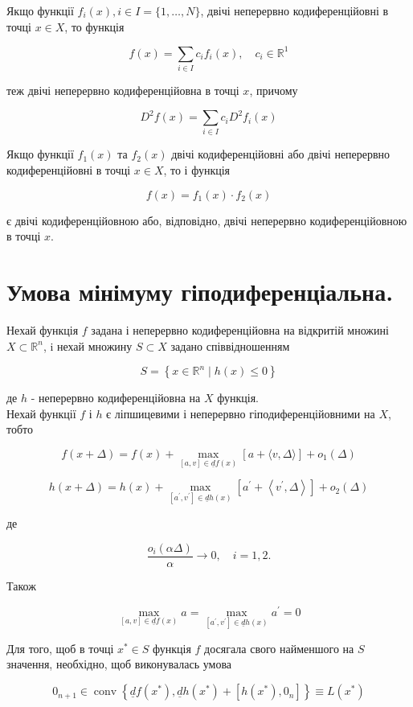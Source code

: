 \documentclass[10pt]{article}
\begin{document}
Якщо функції $f_{i}(x), i \in I=\{1, \ldots, N\}$, двічі неперервно кодиференційовні в точці $x \in X$, то функція

$$
f(x)=\sum_{i \in I} c_{i} f_{i}(x), \quad c_{i} \in \mathbb{R}^{1}
$$

теж двічі неперервно кодиференційовна в точці $x$, причому

$$
D^{2} f(x)=\sum_{i \in I} c_{i} D^{2} f_{i}(x)
$$

Якщо функції $f_{1}(x)$ та $f_{2}(x)$ двічі кодиференційовні або двічі неперервно кодиференційовні в точці $x \in X$, то і функція

$$
f(x)=f_{1}(x) \cdot f_{2}(x)
$$

є двічі кодиференційовною або, відповідно, двічі неперервно кодиференційовною в точці $x$.

\section*{Умова мінімуму гіподиференціальна.}
Нехай функція $f$ задана і неперервно кодиференційовна на відкритій множині $X \subset \mathbb{R}^{n}$, i нехай множину $S \subset X$ задано співвідношенням

$$
S=\left\{x \in \mathbb{R}^{n} \mid h(x) \leq 0\right\}
$$

де $h$ - неперервно кодиференційовна на $X$ функція.\\
Нехай функції $f$ і $h$ є ліпшицевими і неперервно гіподиференційовними на $X$, тобто

$$
f(x+\Delta)=f(x)+\max _{[a, v] \in \underline{d} f(x)}[a+\langle v, \Delta\rangle]+o_{1}(\Delta)
$$

$$
h(x+\Delta)=h(x)+\max _{\left[a^{\prime}, v^{\prime}\right] \in \underline{d} h(x)}\left[a^{\prime}+\left\langle v^{\prime}, \Delta\right\rangle\right]+o_{2}(\Delta)
$$

де

$$
\frac{o_{i}(\alpha \Delta)}{\alpha} \rightarrow 0, \quad i=1,2 .
$$

Також

$$
\max _{[a, v] \in \underline{d} f(x)} a=\max _{\left[a^{\prime}, v^{\prime}\right] \in \underline{d} h(x)} a^{\prime}=0
$$

Для того, щоб в точці $x^{*} \in S$ функція $f$ досягала свого найменшого на $S$ значення, необхідно, щоб виконувалась умова

$$
0_{n+1} \in \operatorname{conv}\left\{\underline{d} f\left(x^{*}\right), \underline{d} h\left(x^{*}\right)+\left[h\left(x^{*}\right), 0_{n}\right]\right\} \equiv L\left(x^{*}\right)
$$
\end{document}
